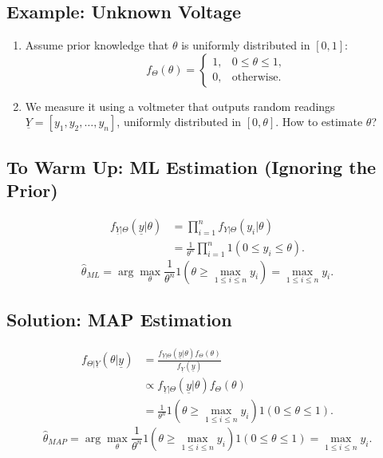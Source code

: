 \subsection{Example: Unknown Voltage}
\begin{enumerate}
    \item Assume prior knowledge that $\theta$ is uniformly distributed in $[0, 1]$:
    \[
    f_\Theta(\theta) =
    \begin{cases}
        1, & 0 \leq \theta \leq 1, \\
        0, & \text{otherwise}.
    \end{cases}
    \]
    \item We measure it using a voltmeter that outputs random readings $\underline{Y} = [y_1, y_2, \dots, y_n]$, uniformly distributed in $[0, \theta]$. How to estimate $\theta$?
\end{enumerate}

\subsection*{To Warm Up: ML Estimation (Ignoring the Prior)}
\begin{align*}
f_{\underline{Y}|\Theta}(\underline{y}|\theta) &= \prod_{i=1}^n f_{Y|\Theta}(y_i|\theta) \\
&= \frac{1}{\theta^n} \prod_{i=1}^n 1(0 \leq y_i \leq \theta).
\end{align*}
\[
\hat{\theta}_{ML} = \arg\max_{\theta} \frac{1}{\theta^n} 1(\theta \geq \max_{1 \leq i \leq n} y_i) = \max_{1 \leq i \leq n} y_i.
\]

\subsection*{Solution: MAP Estimation}
\begin{align*}
f_{\Theta|\underline{Y}}(\theta|\underline{y}) &= \frac{f_{\underline{Y}|\Theta}(\underline{y}|\theta) f_\Theta(\theta)}{f_{\underline{Y}}(\underline{y})} \\
&\propto f_{\underline{Y}|\Theta}(\underline{y}|\theta) f_\Theta(\theta) \\
&= \frac{1}{\theta^n} 1(\theta \geq \max_{1 \leq i \leq n} y_i) 1(0 \leq \theta \leq 1).
\end{align*}
\[
\hat{\theta}_{MAP} = \arg\max_{\theta} \frac{1}{\theta^n} 1(\theta \geq \max_{1 \leq i \leq n} y_i) 1(0 \leq \theta \leq 1) = \max_{1 \leq i \leq n} y_i.
\]

